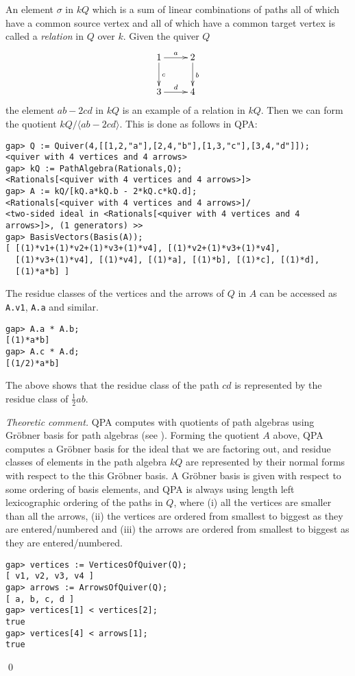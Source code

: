 \documentclass{amsart}
\theoremstyle{definition}
\newcommand{\code}[1]{\texttt{#1}}
\theoremstyle{theoretic}
\newenvironment{theocomm}
{\medskip\small\textit{Theoretic comment.} }
{\qed\par\medskip}
\begin{document}
An element $\sigma$ in $kQ$ which is a sum of linear combinations of
paths all of which have a common source vertex and all of which have a
common target vertex is called a \emph{relation} in $Q$ over $k$.
Given the quiver $Q$
\[\xymatrix{
1\ar[r]^a\ar[d]^c & 2\ar[d]^b\\
3\ar[r]^d & 4
}\]
the element $ab - 2cd$ in $kQ$ is an example of a relation in $kQ$.
Then we can form the quotient $kQ/\langle ab - 2 cd\rangle$.  This is
done as follows in QPA:
\begin{verbatim}
gap> Q := Quiver(4,[[1,2,"a"],[2,4,"b"],[1,3,"c"],[3,4,"d"]]);
<quiver with 4 vertices and 4 arrows>
gap> kQ := PathAlgebra(Rationals,Q);
<Rationals[<quiver with 4 vertices and 4 arrows>]>
gap> A := kQ/[kQ.a*kQ.b - 2*kQ.c*kQ.d];
<Rationals[<quiver with 4 vertices and 4 arrows>]/
<two-sided ideal in <Rationals[<quiver with 4 vertices and 4
arrows>]>, (1 generators) >>
gap> BasisVectors(Basis(A));
[ [(1)*v1+(1)*v2+(1)*v3+(1)*v4], [(1)*v2+(1)*v3+(1)*v4], 
  [(1)*v3+(1)*v4], [(1)*v4], [(1)*a], [(1)*b], [(1)*c], [(1)*d], 
  [(1)*a*b] ]
\end{verbatim}
The residue classes of the vertices and the arrows of $Q$ in $A$ can
be accessed as \code{A.v1}, \code{A.a} and similar.
\begin{verbatim}
gap> A.a * A.b;
[(1)*a*b]
gap> A.c * A.d;
[(1/2)*a*b]
\end{verbatim}
The above shows that the residue class of the path $cd$ is represented
by the residue class of $\frac{1}{2}ab$.

\begin{theocomm}
QPA computes with quotients of path algebras using Gr\"obner basis for
path algebras (see \cite{Green}).  Forming the quotient $A$ above, QPA
computes a Gr\"obner basis for the ideal that we are factoring out,
and residue classes of elements in the path algebra $kQ$ are
represented by their normal forms with respect to the this Gr\"obner
basis.  A Gr\"obner basis is given with respect to some ordering of
basis elements, and QPA is always using length left lexicographic
ordering of the paths in $Q$, where (i) all the vertices are smaller
than all the arrows, (ii) the vertices are ordered from smallest to
biggest as they are entered/numbered and (iii) the arrows are ordered
from smallest to biggest as they are entered/numbered.
\begin{verbatim}
gap> vertices := VerticesOfQuiver(Q);
[ v1, v2, v3, v4 ]
gap> arrows := ArrowsOfQuiver(Q);    
[ a, b, c, d ]
gap> vertices[1] < vertices[2];
true
gap> vertices[4] < arrows[1];
true
\end{verbatim}
\end{theocomm}
\end{document}
